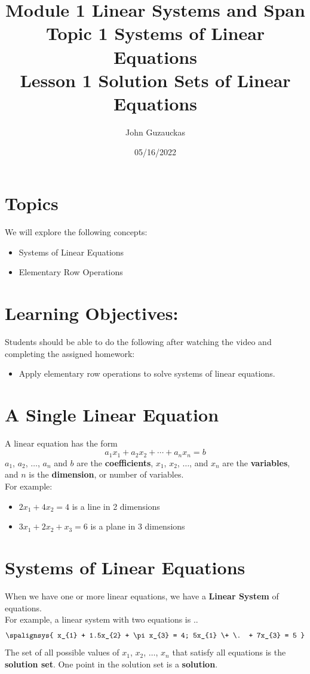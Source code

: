 \documentclass{article}
\title{Module 1 \textendash{} Linear Systems and Span \\
        Topic 1 \textendash{} Systems of Linear Equations \\
        Lesson 1 \textendash{} Solution Sets of Linear Equations}
\author{John Guzauckas}
\date{05/16/2022}
\begin{document}
\maketitle

\section{Topics}
We will explore the following concepts:

\begin{itemize}
    \item Systems of Linear Equations
    \item Elementary Row Operations
\end{itemize}

\section{Learning Objectives:}
Students should be able to do the following after watching the video and
completing the assigned homework:

\begin{itemize}
    \item Apply elementary row operations to solve systems of linear equations.
\end{itemize}

\section{A Single Linear Equation}
A linear equation has the form
\[a_{1}x_{1} + a_{2}x_{2} + \cdots + a_{n}x_{n} = b\]
$a_{1}$, $a_{2}$, $\dots$, $a_{n}$ and $b$ are the \textbf{coefficients}, 
$x_{1}$, $x_{2}$, $\dots$, and $x_{n}$ are the \textbf{variables}, 
and $n$ is the \textbf{dimension}, or number of variables.\\
For example:

\begin{itemize}
    \item $2x_{1} + 4x_{2} = 4$ is a line in 2 dimensions
    \item $3x_{1} + 2x_{2} + x_{3} = 6$ is a plane in 3 dimensions
\end{itemize}

\section{Systems of Linear Equations}
When we have one or more linear equations, we have a
\textbf{Linear System} of equations.\\
For example, a linear system with two equations is
\spalignsysdelims..
\[
  \spalignsys{
    x_{1} + 1.5x_{2} + \pi x_{3} = 4;
    5x_{1} \+ \. + 7x_{3} = 5
  }
\]
The set of all possible values of $x_{1}$, $x_{2}$, $\dots$, $x_{n}$
that satisfy all equations is the \textbf{solution set}. One point
in the solution set is a \textbf{solution}.
\end{document}
